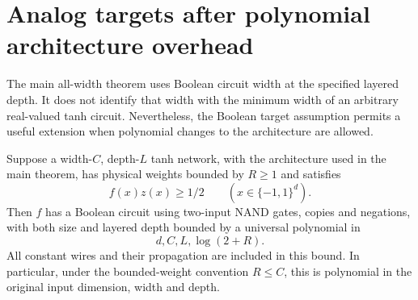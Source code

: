 \section{Analog targets after polynomial architecture overhead}
\label{sec:analog-target-digital-simulation}

The main all-width theorem uses Boolean circuit width at the specified
layered depth. It does not identify that width with the minimum width of
an arbitrary real-valued tanh circuit. Nevertheless, the Boolean target
assumption permits a useful extension when polynomial changes to the
architecture are allowed.

\begin{proposition}
\label{prop:analog-target-digital-simulation}
Suppose a width-$C$, depth-$L$ tanh network, with the architecture used
in the main theorem, has physical weights bounded by $R\ge1$ and
satisfies
\[
 f(x)z(x)\ge1/2\qquad(x\in\{-1,1\}^d).
\]
Then $f$ has a Boolean circuit using two-input NAND gates, copies and
negations, with both size and layered depth bounded by a universal
polynomial in
\[
 d,C,L,\log(2+R).
\]
All constant wires and their propagation are included in this bound.
In particular, under the bounded-weight convention $R\le C$, this
is polynomial in the original input dimension, width and depth.
\end{proposition}

